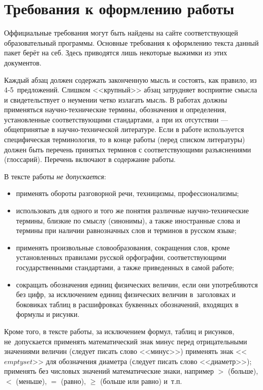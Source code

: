 \documentclass[PI,VKR]{HSEUniversityPractice}
\begin{document}
\chapter{Требования к оформлению работы}

Оффициальные требования могут быть найдены на сайте соответствующей образовательный программы. Основные требования к оформлению текста данный пакет берёт на себ. Здесь приводятся лишь некоторые выжимки из этих документов.

Каждый абзац должен содержать законченную мысль и состоять, как правило, из 4‑5 предложений. 
Слишком <<крупный>> абзац затрудняет восприятие смысла и свидетельствует о неумении четко излагать мысль.
В работах должны применяться научно-технические термины, обозначения и определения, установленные соответствующими стандартами, а при их отсутствии --- общепринятые в научно-технической литературе. Если в работе используется специфическая терминология, то в конце работы (перед списком литературы) должен быть перечень принятых терминов с соответствующими разъяснениями (глоссарий). Перечень включают в содержание работы.

В тексте работы \emph{не допускается}:
\begin{itemize}
	\item применять обороты разговорной речи, техницизмы, профессионализмы;
	\item использовать для одного и того же понятия различные научно-технические термины, близкие по смыслу (синонимы), а также иностранные слова и термины при наличии равнозначных слов и терминов в русском языке;
	\item применять произвольные словообразования, сокращения слов, кроме установленных правилами русской орфографии, соответствующими государственными стандартами, а также приведенных в самой работе;
	\item сокращать обозначения единиц физических величин, если они употребляются без цифр, за исключением единиц физических величин в заголовках и боковиках таблиц в расшифровках буквенных обозначений, входящих в формулы и рисунки.
\end{itemize}

Кроме того, в тексте работы, за исключением формул, таблиц и рисунков, не допускается применять математический знак минус перед отрицательными значениями величин (следует писать слово <<минус>>) применять знак <<$emptyset$>> для обозначения диаметра (следует писать слово <<диаметр>>); применять без числовых значений математические знаки, например $>$ (больше), $<$ (меньше), $=$ (равно), $\geq$ (больше или равно) и т.п.
\end{document}
